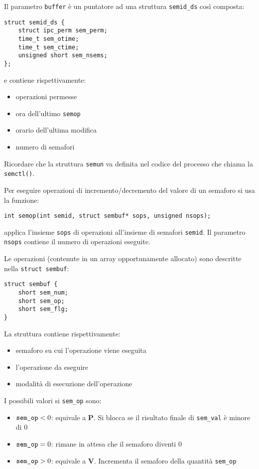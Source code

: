 \documentclass[a4paper]{article}
\begin{document}
Il parametro \verb|buffer| è un puntatore ad una struttura \verb|semid_ds| così composta:
\begin{verbatim}
struct semid_ds {
    struct ipc_perm sem_perm;
    time_t sem_otime;
    time_t sem_ctime;
    unsigned short sem_nsems;
};
\end{verbatim}

e contiene rispettivamente:
\begin{itemize}
\item operazioni permesse
\item ora dell'ultimo \verb|semop| 
\item orario dell'ultima modifica
\item numero di semafori
\end{itemize}

Ricordare che la struttura \verb|semun| va definita nel codice del processo che chiama la \verb|semctl()|.

Per eseguire operazioni di incremento/decremento del valore di un semaforo si usa la funzione:
\begin{verbatim}
int semop(int semid, struct sembuf* sops, unsigned nsops);
\end{verbatim}
applica l'insieme \verb|sops| di operazioni all'insieme di semafori \verb|semid|. Il parametro \verb|nsops| contiene il numero di operazioni eseguite.

Le operazioni (contenute in un array opportunamente allocato) sono descritte nella \verb|struct sembuf|:
\begin{verbatim}
struct sembuf {
    short sem_num;
    short sem_op;
    short sem_flg;
}
\end{verbatim}
La struttura contiene rispettivamente:
\begin{itemize}
\item semaforo su cui l'operazione viene eseguita
\item l'operazione da eseguire
\item modalità di esecuzione dell'operazione
\end{itemize}

I possibili valori si \verb|sem_op| sono:
\begin{itemize}
\item $\verb|sem_op|<0$: equivale a \textbf{P}. Si blocca se il risultato finale di \verb|sem_val| è minore di 0
\item $\verb|sem_op|=0$: rimane in attesa che il semaforo diventi 0
\item $\verb|sem_op|>0$: equivale a \textbf{V}. Incrementa il semaforo della quantità \verb|sem_op|
\end{itemize}
\end{document}
